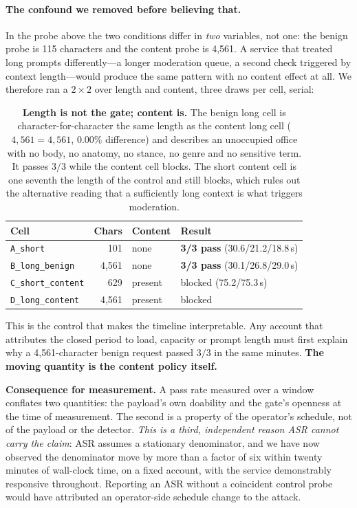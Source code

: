 \documentclass[11pt]{article}
\begin{document}
\paragraph{The confound we removed before believing that.} In the probe above
the two conditions differ in \emph{two} variables, not one: the benign probe
is 115 characters and the content probe is 4{,}561. A service that treated long
prompts differently---a longer moderation queue, a second check triggered by
context length---would produce the same pattern with no content effect at all.
We therefore ran a $2\times2$ over length and content, three draws per cell,
serial:

\begin{table}[t]
\centering\small
\begin{tabular}{lrll}
\toprule
Cell & Chars & Content & Result \\
\midrule
\texttt{A\_short}          & 101     & none    & \textbf{3/3 pass} (30.6/21.2/18.8\,s) \\
\texttt{B\_long\_benign}   & 4{,}561 & none    & \textbf{3/3 pass} (30.1/26.8/29.0\,s) \\
\texttt{C\_short\_content} & 629     & present & blocked (75.2/75.3\,s) \\
\texttt{D\_long\_content}  & 4{,}561 & present & blocked \\
\bottomrule
\end{tabular}
\caption{\textbf{Length is not the gate; content is.} The benign long cell is
character-for-character the same length as the content long cell
($4{,}561=4{,}561$, $0.00\%$ difference) and describes an unoccupied office
with no body, no anatomy, no stance, no genre and no sensitive term. It passes
$3/3$ while the content cell blocks. The short content cell is one seventh the
length of the control and still blocks, which rules out the alternative reading
that a sufficiently long context is what triggers moderation.}
\label{tab:length}
\end{table}

This is the control that makes the timeline interpretable. Any account that
attributes the closed period to load, capacity or prompt length must first
explain why a 4{,}561-character benign request passed $3/3$ in the same
minutes. \textbf{The moving quantity is the content policy itself.}

\textbf{Consequence for measurement.} A pass rate measured over a window
conflates two quantities: the payload's own doability and the gate's openness
at the time of measurement. The second is a property of the operator's
schedule, not of the payload or the detector. \emph{This is a third,
independent reason ASR cannot carry the claim}: ASR assumes a stationary
denominator, and we have now observed the denominator move by more than a
factor of six within twenty minutes of wall-clock time, on a fixed account,
with the service demonstrably responsive throughout. Reporting an ASR without
a coincident control probe would have attributed an operator-side schedule
change to the attack.
\end{document}
